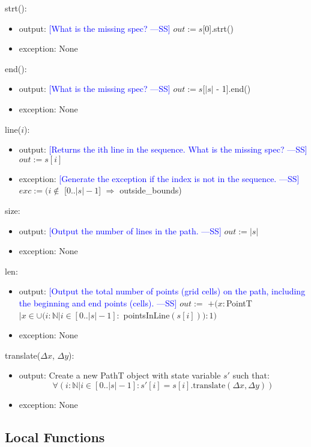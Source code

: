 \documentclass[12pt]{article}
\newcommand{\authornote}[3]{\textcolor{#1}{[#3 ---#2]}}
\newcommand{\authornote}[3]{}
\newcommand{\wss}[1]{\authornote{blue}{SS}{#1}}
\begin{document}
\noindent strt():
\begin{itemize}
\item output: \wss{What is the missing spec?} $out := s$[0].strt()
\item exception: None
\end{itemize}

\noindent end():
\begin{itemize}
\item output: \wss{What is the missing spec?} $out := s$[$|s|$ - 1].end() 
\item exception: None
\end{itemize}

\noindent line($i$):
\begin{itemize}
\item output: \wss{Returns the ith line in the sequence.  What is the missing spec?} $out:= s[i]$
\item exception: \wss{Generate the exception if the index is not in the sequence.} $exc := (i \notin$ [0..$|s| - 1$] $\Rightarrow$ outside\_bounds)
\end{itemize}

\noindent size:
\begin{itemize}
\item output: \wss{Output the number of lines in the path.} $out := |s|$ 
\item exception: None
\end{itemize}

\noindent len:
\begin{itemize}
\item output: \wss{Output the total number of points (grid cells) on the path,
    including the beginning and end points (cells).} $out :=$ $+(x: $PointT$ | x \in \cup(i: \mathbb{N} | i \in [0..|s|-1] :$ pointsInLine$(s[i])) : 1)$
\item exception: None
\end{itemize}

\noindent translate($\Delta x$, $\Delta y$):
\begin{itemize}
\item output: Create a new PathT object with state variable $s'$ such that:
$$\forall(i: \mathbb{N} | i \in [0..|s|-1] : s'[i] = s[i].\mbox{translate}(\Delta x, \Delta y))$$
\item exception: None
\end{itemize}

\subsection*{Local Functions}
\end{document}
